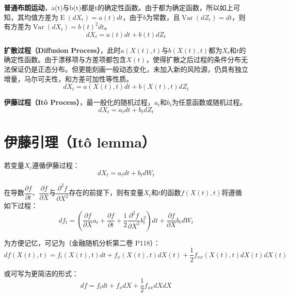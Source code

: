 \documentclass[11pt]{article}
\newcommand{\E}{\operatorname{E}}
\newcommand{\Var}{\operatorname{Var}}
\begin{document}
\textbf{普通布朗运动}，a(t)与b(t)都是t的确定性函数。由于都为确定函数，所以如上可知，其均值方差为$\E(dX_t) = a(t)dt$，由于$b$为常数，且$\Var(dZ_t)=dt$，则有方差为$\Var(dX_t)=b(t)^2 dt$。
\begin{equation*}
    dX_t =a(t) dt + b(t) dZ_t
\end{equation*}

\textbf{扩散过程（Diffusion Process）}，此时$a(X(t),t)$与$b(X(t),t)$都为$X_t$和$t$的确定性函数。由于漂移项与方差项都包含$X(t)$，使得扩散之后过程的条件分布无法保证仍是正态分布。但更能刻画一般动态变化，未加入新的风险源，仍具有独立增量，马尔可夫性，和方差可加性等性质。
\begin{equation*}
    dX_t =a(X(t),t) dt + b(X(t),t) dZ_t
\end{equation*}

\textbf{伊藤过程（Itô Process）}，最一般化的随机过程，$a_t$和$b_t$为任意函数或随机过程。
\begin{equation*}
    dX_t =a_t dt + b_t dZ_t
\end{equation*}

\section{伊藤引理（Itô lemma）}

若变量$X_t$遵循伊藤过程：
\begin{equation*}
    dX_t =a_t dt + b_t dW_t
\end{equation*}

在导数$\dfrac{\partial f}{\partial t}$、$\dfrac{\partial f}{\partial X}$与$\dfrac{\partial^2 f}{\partial X^2}$存在的前提下，则有变量$X_t$和$t$的函数$f(X(t),t)$将遵循如下过程：
\begin{equation*}
    df_t = \left(\frac{\partial f}{\partial X}a_t  + \frac{\partial f}{\partial t} + \frac{1}{2}\frac{\partial^2 f}{\partial X^2} b^2_t \right)dt + \frac{\partial f}{\partial X} b_t dW_t
\end{equation*}

为方便记忆，可记为（金融随机分析第二卷 P118）：
\begin{equation*}
    \boxed{
        df(X(t),t) = f_t(X(t),t)dt + f_x(X(t),t)dX(t) + \frac{1}{2}f_{xx}(X(t),t)dX(t)dX(t)
    }
\end{equation*}

或可写为更简洁的形式：
\begin{equation*}
    \boxed{
        df = f_t dt + f_x dX + \frac{1}{2}f_{xx}dXdX
    }
\end{equation*}
\end{document}
